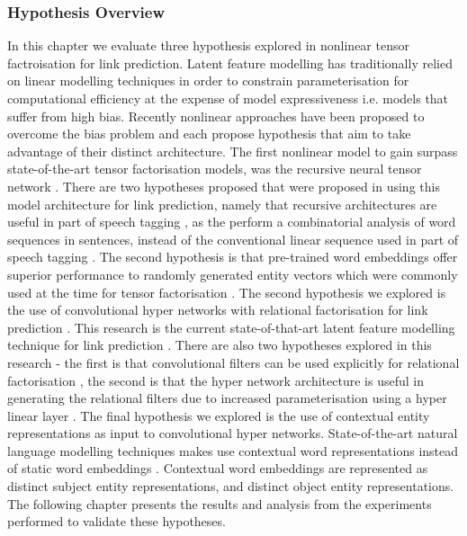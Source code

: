 \subsubsection{Hypothesis Overview}
In this chapter we evaluate three hypothesis explored in nonlinear tensor factroisation for link prediction. Latent feature modelling has traditionally relied on linear modelling techniques in order to constrain parameterisation for computational efficiency at the expense of model expressiveness i.e. models that suffer from high bias. Recently nonlinear approaches have been proposed to overcome the bias problem and each propose hypothesis that aim to take advantage of their distinct architecture. The first nonlinear model to gain surpass state-of-the-art tensor factorisation models, was the recursive neural tensor network \cite{refefence}. There are two hypotheses proposed that were proposed in using this model architecture for link prediction, namely that recursive architectures are useful in part of speech tagging \cite{reference}, as the perform a combinatorial analysis of word sequences in sentences, instead of the conventional linear sequence used in part of speech tagging \cite{reference}. The second hypothesis is that pre-trained word embeddings offer superior performance to randomly generated entity vectors which were commonly used at the time for tensor factorisation \cite{reference}. \newline
The second hypothesis we explored is the use of convolutional hyper networks with relational factorisation for link prediction \cite{reference}. This research is the current state-of-that-art latent feature modelling technique for link prediction \cite{reference}. There are also two hypotheses explored in this research - the first is that convolutional filters can be used explicitly for relational factorisation \cite{reference}, the second is that the hyper network architecture is useful in generating the relational filters due to increased parameterisation using a hyper linear layer \cite{reference}. \newline
The final hypothesis we explored is the use of contextual entity representations as input to convolutional hyper networks. State-of-the-art natural language modelling techniques makes use contextual word representations \cite{Elmo, Bert} instead of static word embeddings \cite{fasttext, GloVe, Word2Vec}. Contextual word embeddings are represented as distinct subject entity representations, and distinct object entity representations. \newline
The following chapter presents the results and analysis from the experiments performed to validate these hypotheses.


